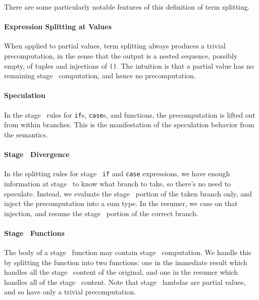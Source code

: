 There are some particularly notable features of this definition of term
splitting.

\paragraph {Expression Splitting at Values}

When applied to partial values, term splitting always produces a trivial
precomputation, in the sense that the output is a nested sequence, possibly
empty, of tuples and injections of \texttt{()}. The intuition is that a partial
value has no remaining stage \bbone\ computation, and hence no precomputation.


\paragraph {Speculation}

In the stage \bbtwo\ rules for {\tt if}s, {\tt case}s, and functions, the
precomputation is lifted out from within branches. This is the manifestation of
the speculation behavior from the semantics.

\paragraph {Stage \bbone\ Divergence}

In the splitting rules for stage \bbone\ {\tt if} and {\tt case} expressions, we
have enough information at stage \bbone\ to know what branch to take, so there's
no need to speculate. Instead, we evaluate the stage \bbone\ portion of the
taken branch only, and inject the precomputation into a sum type. In the
resumer, we case on that injection, and resume the stage \bbtwo\ portion of the
correct branch.

\paragraph {Stage \bbone\ Functions}

The body of a stage \bbone\ function may contain stage \bbtwo\ computation. We
handle this by splitting the function into two functions: one in the immediate
result which handles all the stage \bbone\ content of the original, and one in
the resumer which handles all of the stage \bbtwo\ content. Note that stage
\bbone\ lambdas are partial values, and so have only a trivial precomputation.

